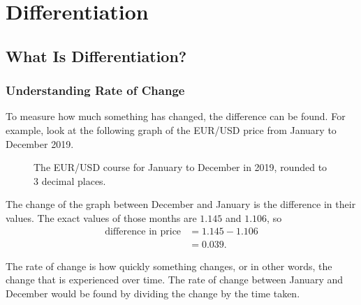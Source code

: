 \chapter{Differentiation}
\section{What Is Differentiation?}

\subsection{Understanding Rate of Change}
To measure how much something has changed, the difference can be found. For example, look at the following graph of the EUR/USD price from January to December 2019.

\begin{figure}[h!]
	\centering
	\caption{The EUR/USD course for January to December in 2019, rounded to 3 decimal places.}
	\label{fig:EURUSD}
\end{figure}

The change of the graph between December and January is the difference in their values. The exact values of those months are $1.145$ and $1.106$, so
\begin{align*}
	\text{difference in price} &= 1.145 - 1.106\\
	&=0.039\text{.}
\end{align*}

The rate of change is how quickly something changes, or in other words, the change that is experienced over time. The rate of change between January and December would be found by dividing the change by the time taken.


